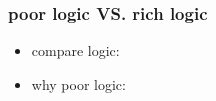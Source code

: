 \begin{frame}
    \frametitle{poor logic VS. rich logic}
    \begin{itemize}
        \item compare logic:
        \item why poor logic:




    \end{itemize}
\end{frame}

